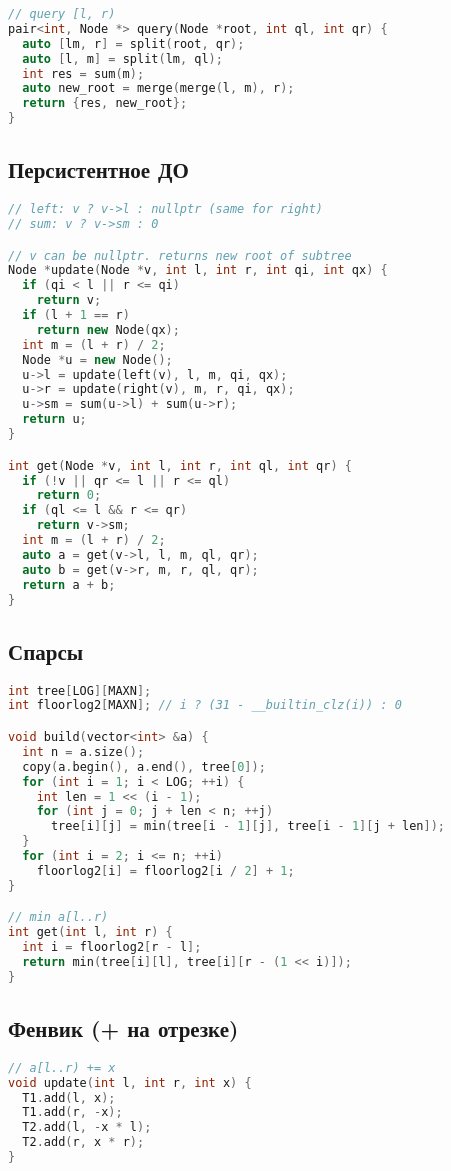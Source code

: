 \documentclass[10pt,a4paper,landscape,twosided]{extarticle}
\begin{document}
\begin{multicols*}{3}
\begin{lstlisting}[language=C++]
// query [l, r)
pair<int, Node *> query(Node *root, int ql, int qr) {
  auto [lm, r] = split(root, qr);
  auto [l, m] = split(lm, ql);
  int res = sum(m);
  auto new_root = merge(merge(l, m), r);
  return {res, new_root};
}

\end{lstlisting}

\subsection{Персистентное ДО}
\begin{lstlisting}[language=C++]
// left: v ? v->l : nullptr (same for right)
// sum: v ? v->sm : 0

// v can be nullptr. returns new root of subtree
Node *update(Node *v, int l, int r, int qi, int qx) {
  if (qi < l || r <= qi)
    return v;
  if (l + 1 == r)
    return new Node(qx);
  int m = (l + r) / 2;
  Node *u = new Node();
  u->l = update(left(v), l, m, qi, qx);
  u->r = update(right(v), m, r, qi, qx);
  u->sm = sum(u->l) + sum(u->r);
  return u;
}

int get(Node *v, int l, int r, int ql, int qr) {
  if (!v || qr <= l || r <= ql)
    return 0;
  if (ql <= l && r <= qr)
    return v->sm;
  int m = (l + r) / 2;
  auto a = get(v->l, l, m, ql, qr);
  auto b = get(v->r, m, r, ql, qr);
  return a + b;
}

\end{lstlisting}

\subsection{Спарсы}
\begin{lstlisting}[language=C++]
int tree[LOG][MAXN];
int floorlog2[MAXN]; // i ? (31 - __builtin_clz(i)) : 0

void build(vector<int> &a) {
  int n = a.size();
  copy(a.begin(), a.end(), tree[0]);
  for (int i = 1; i < LOG; ++i) {
    int len = 1 << (i - 1);
    for (int j = 0; j + len < n; ++j)
      tree[i][j] = min(tree[i - 1][j], tree[i - 1][j + len]);
  }
  for (int i = 2; i <= n; ++i)
    floorlog2[i] = floorlog2[i / 2] + 1;
}

// min a[l..r)
int get(int l, int r) {
  int i = floorlog2[r - l];
  return min(tree[i][l], tree[i][r - (1 << i)]);
}

\end{lstlisting}

\subsection{Фенвик (+ на отрезке)}
\begin{lstlisting}[language=C++]
// a[l..r) += x
void update(int l, int r, int x) {
  T1.add(l, x);
  T1.add(r, -x);
  T2.add(l, -x * l);
  T2.add(r, x * r);
}


\end{lstlisting}
\end{multicols*}
\end{document}
